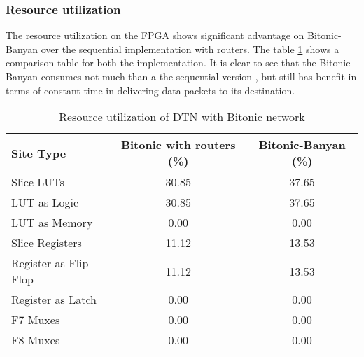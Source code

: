 				 \subsubsection{Resource utilization}
					      The resource utilization on the FPGA shows significant advantage on Bitonic-Banyan over the sequential implementation with routers. The table \ref{fig:bitonic_utilisation}
					      shows a comparison table for both the implementation. It is clear to see that the Bitonic-Banyan consumes not much than a the sequential version , but still has benefit in
					      terms of constant time in delivering data packets to its destination.
					    \begin{table}
					    \begin{center}
					      \begin{tabular}{l | c | c }
						\textbf{Site Type}  & \textbf{Bitonic with routers (\%)} & \textbf{Bitonic-Banyan (\%)} \\
						\hline \hline
						Slice LUTs 			& 30.85 & 37.65 \\ 
						\quad LUT as Logic		& 30.85 & 37.65 \\
						\quad LUT as Memory		& 0.00 & 0.00 	\\
						Slice Registers 		& 11.12	& 13.53 \\
						\quad Register as Flip Flop	& 11.12	& 13.53	\\
						\quad Register as Latch	& 0.00	& 0.00	\\
						F7 Muxes			& 0.00	& 0.00	\\
						F8 Muxes 			& 0.00	& 0.00	\\
					      \end{tabular}
					      \end{center}
					      \caption{Resource utilization of DTN with Bitonic network}
					      \label{fig:bitonic_utilisation}
					    \end{table}


